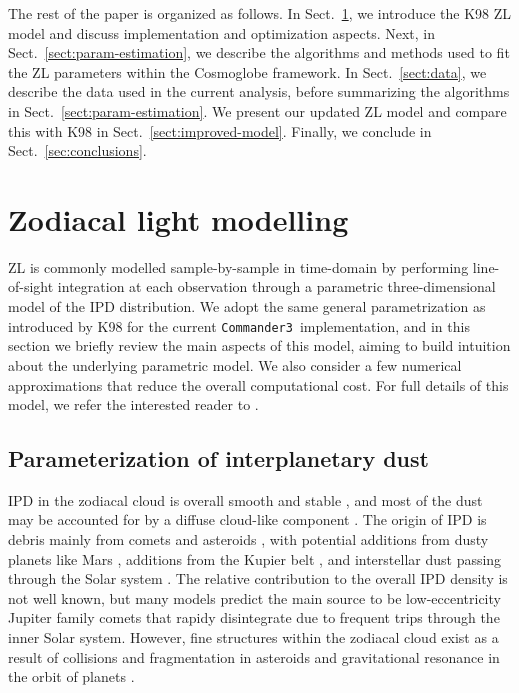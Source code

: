 \documentclass[twocolumn]{aa}
\def\commanderthree{\texttt{Commander3}}
\begin{document}
The rest of the paper is organized as follows. In
Sect.~\ref{sect:zodi-model}, we introduce the K98 ZL model and discuss
implementation and optimization aspects. Next, in 
Sect.~\ref{sect:param-estimation}, we describe the algorithms and methods
used to fit the ZL parameters within the Cosmoglobe framework.
In Sect.~\ref{sect:data}, we describe the data used in the current
analysis, before summarizing the algorithms in
Sect.~\ref{sect:param-estimation}. We present our updated ZL model and
compare this with K98 in Sect.~\ref{sect:improved-model}. Finally, we
conclude in Sect.~\ref{sec:conclusions}.


\section{Zodiacal light modelling}\label{sect:zodi-model}
ZL is commonly modelled sample-by-sample in time-domain by performing
line-of-sight integration at each observation through a parametric
three-dimensional model of the IPD distribution. We adopt the same
general parametrization as introduced by K98 for the current
\commanderthree\ implementation, and in this section we briefly review
the main aspects of this model, aiming to build intuition about the
underlying parametric model. We also consider a few numerical
approximations that reduce the overall computational cost. For full
details of this model, we refer the interested reader to
\citet{Kelsall1998}.

\subsection{Parameterization of interplanetary dust}
IPD in the zodiacal cloud is overall smooth and stable 
\citep{Leinert1989}, and most of the dust may be accounted for by a 
diffuse cloud-like component \citep{Kelsall1998}. The origin of IPD 
is debris mainly from comets \citep{Liou1995} and asteroids \citep{Dermott1984}, 
with potential additions from dusty planets like Mars \citep{Jorgensen2021}, additions from 
the Kupier belt \citep{Mann2009}, and interstellar dust passing 
through the Solar system \citep{Robinson2013}. The relative contribution to the overall 
IPD density is not well known, but many models predict the main 
source to be low-eccentricity Jupiter family comets that rapidy 
disintegrate due to frequent trips through the inner Solar system.
However, fine structures within the zodiacal cloud exist as a result 
of collisions and fragmentation in asteroids and gravitational 
resonance in the orbit of planets 
\citep{Low1984, Dermott1984, Dermott1994, Reach1997}.
\end{document}
